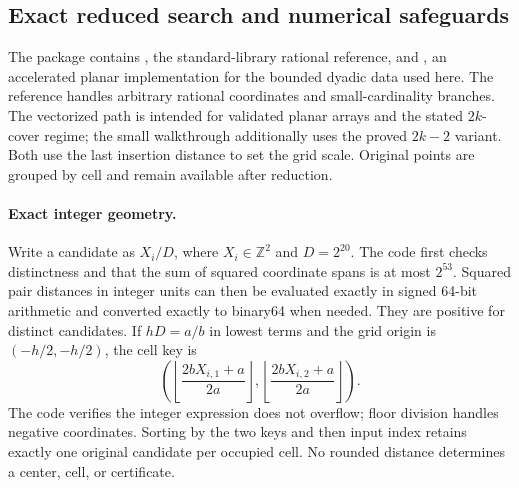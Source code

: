\documentclass[a4paper,12pt]{article}
\numberwithin{equation}{section}
\begin{document}
\subsection{Exact reduced search and numerical safeguards}\label{app:exact-search}
The package contains , the standard-library
rational reference, and , an accelerated planar
implementation for the bounded dyadic data used here. The reference handles arbitrary rational
coordinates and small-cardinality branches. The vectorized path is intended for validated planar
arrays and the stated $2k$-cover regime; the small walkthrough additionally uses the proved $2k-2$
variant. Both use the last insertion distance to set the grid scale.
Original points are grouped by cell and remain available after reduction.

\paragraph{Exact integer geometry.}
Write a candidate as $X_i/D$, where $X_i\in\mathbb Z^2$ and $D=2^{20}$. The code first checks
distinctness and that the sum of squared coordinate spans is at most $2^{53}$. Squared pair
distances in integer units can then be evaluated exactly in signed 64-bit arithmetic and converted
exactly to binary64 when needed. They are positive for distinct candidates. If $hD=a/b$ in lowest
terms and the grid origin is $(-h/2,-h/2)$, the cell key is
\[
 \left(\left\lfloor\frac{2bX_{i,1}+a}{2a}\right\rfloor,
       \left\lfloor\frac{2bX_{i,2}+a}{2a}\right\rfloor\right).
\]
The code verifies the integer expression does not overflow; floor division handles negative
coordinates. Sorting by the two keys and then input index retains exactly one original candidate
per occupied cell. No rounded distance determines a center, cell, or certificate.
\end{document}
